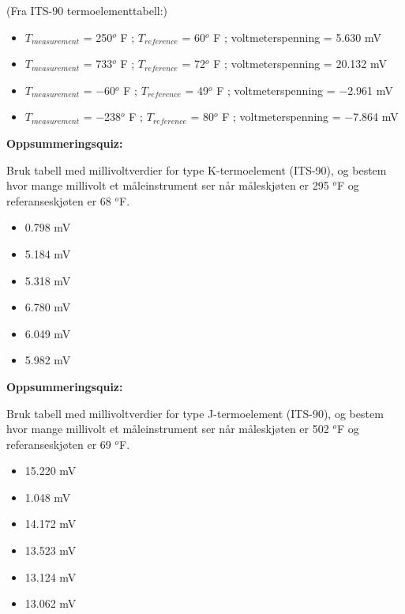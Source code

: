 





(Fra ITS-90 termoelementtabell:)

\begin{itemize}
\item{} $T_{measurement}$ = 250$^{o}$ F ; $T_{reference}$ = 60$^{o}$ F ; voltmeterspenning = 5.630 mV
\item{} $T_{measurement}$ = 733$^{o}$ F ; $T_{reference}$ = 72$^{o}$ F ; voltmeterspenning = 20.132 mV
\item{} $T_{measurement}$ = $-$60$^{o}$ F ; $T_{reference}$ = 49$^{o}$ F ; voltmeterspenning = $-$2.961 mV
\item{} $T_{measurement}$ = $-$238$^{o}$ F ; $T_{reference}$ = 80$^{o}$ F ; voltmeterspenning = $-$7.864 mV
\end{itemize}




\vfil \eject

\noindent
{\bf Oppsummeringsquiz:}

Bruk tabell med millivoltverdier for type K-termoelement (ITS-90), og bestem hvor mange millivolt et måleinstrument ser når måleskjøten er 295 $^{o}$F og referanseskjøten er 68 $^{o}$F.

\begin{itemize}
\item{} 0.798 mV
\vskip 5pt
\item{} 5.184 mV
\vskip 5pt
\item{} 5.318 mV
\vskip 5pt
\item{} 6.780 mV
\vskip 5pt
\item{} 6.049 mV
\vskip 5pt
\item{} 5.982 mV
\end{itemize}




\vfil \eject

\noindent
{\bf Oppsummeringsquiz:}

Bruk tabell med millivoltverdier for type J-termoelement (ITS-90), og bestem hvor mange millivolt et måleinstrument ser når måleskjøten er 502 $^{o}$F og referanseskjøten er 69 $^{o}$F.

\begin{itemize}
\item{} 15.220 mV
\vskip 5pt
\item{} 1.048 mV
\vskip 5pt
\item{} 14.172 mV
\vskip 5pt
\item{} 13.523 mV
\vskip 5pt
\item{} 13.124 mV
\vskip 5pt
\item{} 13.062 mV
\end{itemize}



